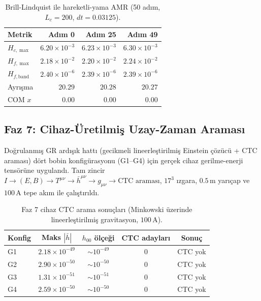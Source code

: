 \begin{table}[t]
\centering
\caption{Brill-Lindquist ile hareketli-yama AMR (50 adım, $L_c=200$, $dt=0.03125$).}
\label{tab:amr-moving-50-Lc200}
\begin{tabular}{lrrr}
\hline
Metrik & Adım 0 & Adım 25 & Adım 49 \\
\hline
$H_{c,\max}$ & $6.20\times 10^{-3}$ & $6.23\times 10^{-3}$ & $6.30\times 10^{-3}$ \\
$H_{f,\max}$ & $2.18\times 10^{-2}$ & $2.20\times 10^{-2}$ & $2.24\times 10^{-2}$ \\
$H_{f,\text{band}}$ & $2.40\times 10^{-6}$ & $2.39\times 10^{-6}$ & $2.39\times 10^{-6}$ \\
Ayrışma & $20.29$ & $20.28$ & $20.27$ \\
COM $x$ & $0.00$ & $0.00$ & $0.00$ \\
\hline
\end{tabular}
\end{table}

\subsection{Faz 7: Cihaz-Üretilmiş Uzay-Zaman Araması}

Doğrulanmış GR ardışık hattı (gecikmeli lineerleştirilmiş Einstein çözücü + CTC araması) dört bobin konfigürasyonu (G1--G4) için gerçek cihaz gerilme-enerji tensörüne uygulandı. Tam zincir $I \to (E,B) \to T^{\mu\nu} \to \bar{h}^{\mu\nu} \to g_{\mu\nu} \to \text{CTC araması}$, $17^3$ ızgara, $0.5\,\text{m}$ yarıçap ve $100\,\text{A}$ tepe akım ile çalıştırıldı.

\begin{table}[t]
\centering
\caption{Faz 7 cihaz CTC arama sonuçları (Minkowski üzerinde lineerleştirilmiş gravitasyon, $100\,\text{A}$).}
\label{tab:phase7-ctc-search}
\begin{tabular}{lcccc}
\hline
Konfig & Maks $|\bar{h}|$ & $h_{00}$ ölçeği & CTC adayları & Sonuç \\
\hline
G1 & $2.18\times 10^{-49}$ & $\sim 10^{-49}$ & 0 & CTC yok \\
G2 & $2.90\times 10^{-50}$ & $\sim 10^{-50}$ & 0 & CTC yok \\
G3 & $1.31\times 10^{-51}$ & $\sim 10^{-51}$ & 0 & CTC yok \\
G4 & $2.59\times 10^{-50}$ & $\sim 10^{-50}$ & 0 & CTC yok \\
\hline
\end{tabular}
\end{table}

